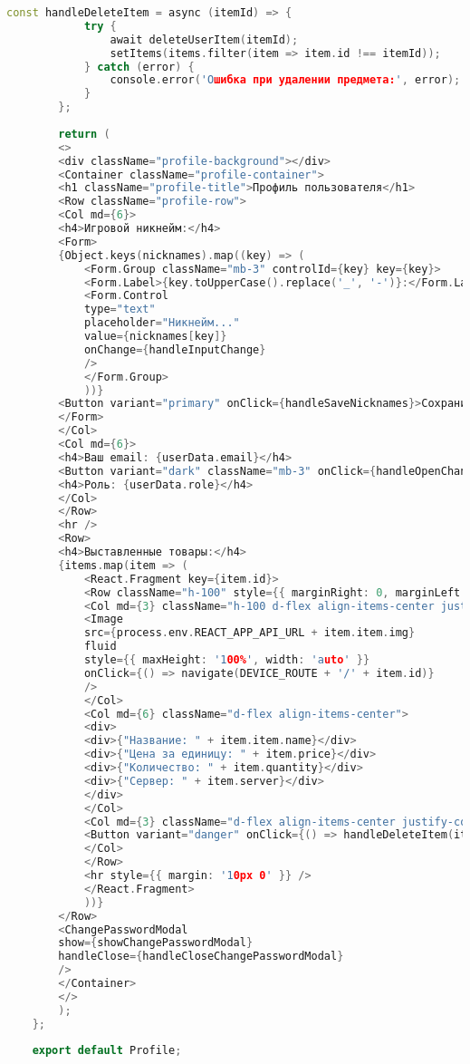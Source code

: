 \begin{lstlisting}[language=C++]
		const handleDeleteItem = async (itemId) => {
			try {
				await deleteUserItem(itemId);
				setItems(items.filter(item => item.id !== itemId));
			} catch (error) {
				console.error('Ошибка при удалении предмета:', error);
			}
		};
		
		return (
		<>
		<div className="profile-background"></div>
		<Container className="profile-container">
		<h1 className="profile-title">Профиль пользователя</h1>
		<Row className="profile-row">
		<Col md={6}>
		<h4>Игровой никнейм:</h4>
		<Form>
		{Object.keys(nicknames).map((key) => (
			<Form.Group className="mb-3" controlId={key} key={key}>
			<Form.Label>{key.toUpperCase().replace('_', '-')}:</Form.Label>
			<Form.Control 
			type="text" 
			placeholder="Никнейм..." 
			value={nicknames[key]} 
			onChange={handleInputChange} 
			/>
			</Form.Group>
			))}
		<Button variant="primary" onClick={handleSaveNicknames}>Сохранить изменения</Button>
		</Form>
		</Col>
		<Col md={6}>
		<h4>Ваш email: {userData.email}</h4>
		<Button variant="dark" className="mb-3" onClick={handleOpenChangePasswordModal}>Изменить пароль</Button>
		<h4>Роль: {userData.role}</h4>
		</Col>
		</Row>
		<hr />
		<Row>
		<h4>Выставленные товары:</h4>
		{items.map(item => (
			<React.Fragment key={item.id}>
			<Row className="h-100" style={{ marginRight: 0, marginLeft: 0 }}>
			<Col md={3} className="h-100 d-flex align-items-center justify-content-center" style={{ paddingRight: 0, paddingLeft: 0 }}>
			<Image
			src={process.env.REACT_APP_API_URL + item.item.img}
			fluid
			style={{ maxHeight: '100%', width: 'auto' }}
			onClick={() => navigate(DEVICE_ROUTE + '/' + item.id)}
			/>
			</Col>
			<Col md={6} className="d-flex align-items-center">
			<div>
			<div>{"Название: " + item.item.name}</div>
			<div>{"Цена за единицу: " + item.price}</div>
			<div>{"Количество: " + item.quantity}</div>
			<div>{"Сервер: " + item.server}</div>
			</div>
			</Col>
			<Col md={3} className="d-flex align-items-center justify-content-center">
			<Button variant="danger" onClick={() => handleDeleteItem(item.id)}>Удалить</Button>
			</Col>
			</Row>
			<hr style={{ margin: '10px 0' }} />
			</React.Fragment>
			))}
		</Row>
		<ChangePasswordModal
		show={showChangePasswordModal}
		handleClose={handleCloseChangePasswordModal}
		/>
		</Container>
		</>
		);
	};
	
	export default Profile;
\end{lstlisting}

